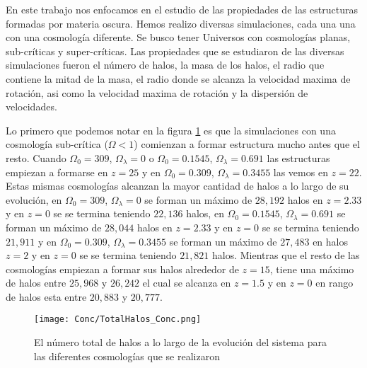 \renewcommand{\altname}{Conclusiones}
\lhead[\fancyplain{}{}]%
      {\fancyplain{}{\bfseries \altname}}
\addchap{\altname}
En este trabajo nos enfocamos en el estudio de las propiedades de las estructuras formadas por materia oscura. Hemos realizo diversas simulaciones, cada una una con una cosmología diferente. Se busco tener Universos con cosmologías planas, sub-críticas y super-críticas. Las propiedades que se estudiaron de las diversas simulaciones fueron el número de halos, la masa de los halos, el radio que contiene la mitad de la masa, el radio donde se alcanza la velocidad maxima de rotación, asi como la velocidad maxima de rotación y la dispersión de velocidades.

Lo primero que podemos notar en la figura \ref{fig:Conc_TotalHalos} es que la simulaciones con una cosmología sub-crítica ($\Omega < 1$) comienzan a formar estructura mucho antes que el resto. Cuando $\Omega_0 = 309$, $\Omega_\lambda=0$ o $\Omega_0=0.1545$, $\Omega_\lambda=0.691$ las estructuras empiezan a formarse en $z=25$ y en $\Omega_0=0.309$, $\Omega_\lambda=0.3455$ las vemos en $z=22$. Estas mismas cosmologías alcanzan la mayor cantidad de halos a lo largo de su evolución, en $\Omega_0 = 309$, $\Omega_\lambda=0$ se forman un máximo de $28,192$ halos en $z=2.33$ y en $z=0$ se se termina teniendo $22,136$ halos, en $\Omega_0 = 0.1545$, $\Omega_\lambda=0.691$ se forman un máximo de $28,044$ halos en $z=2.33$ y en $z=0$ se se termina teniendo $21,911$ y en $\Omega_0 = 0.309$, $\Omega_\lambda=0.3455$ se forman un máximo de $27,483$ en halos $z=2$ y en $z=0$ se se termina teniendo $21,821$ halos. Mientras que el resto de las cosmologías empiezan a formar sus halos alrededor de $z=15$, tiene una máximo de halos entre $25,968$ y $26,242$ el cual se alcanza en $z=1.5$ y en $z=0$ en rango de halos esta entre $20,883$ y $20,777$.

\begin{figure}[H]
      \centering
      \texttt{[image: Conc/TotalHalos\_Conc.png]}
      \caption[Evolución del total de halos para todas las cosmologías]{El número total de halos a lo largo de la evolución del sistema para las diferentes cosmologías que se realizaron}
      \label{fig:Conc_TotalHalos}
\end{figure}

